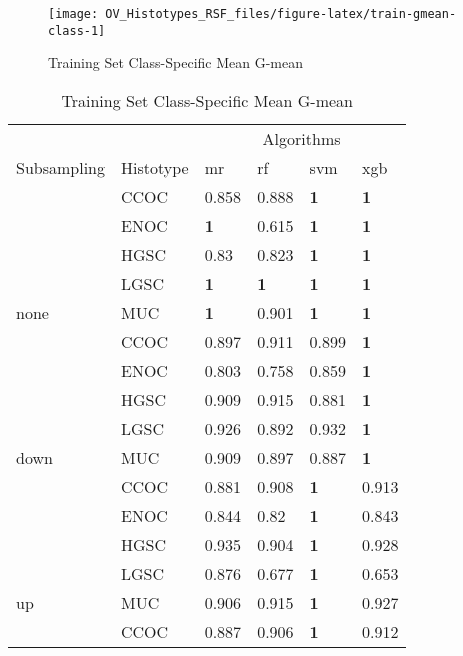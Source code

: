 \documentclass[
]{report}
\begin{document}
\begin{figure}[H]

{\centering \texttt{[image: OV\_Histotypes\_RSF\_files/figure-latex/train-gmean-class-1]} 

}

\caption{Training Set Class-Specific Mean G-mean}\label{fig:train-gmean-class}
\end{figure}

\begin{table}

\caption{\label{tab:train-gmean-class-table}Training Set Class-Specific Mean G-mean}
\centering
\begin{tabular}[t]{l|l|l|l|l|l}
\hline
\multicolumn{2}{c|}{ } & \multicolumn{4}{c}{Algorithms} \\
\cline{3-6}
Subsampling & Histotype & mr & rf & svm & xgb\\
\hline
 & CCOC & 0.858 & 0.888 & \textbf{1} & \textbf{1}\\
\cline{2-6}
 & ENOC & \textbf{1} & 0.615 & \textbf{1} & \textbf{1}\\
\cline{2-6}
 & HGSC & 0.83 & 0.823 & \textbf{1} & \textbf{1}\\
\cline{2-6}
 & LGSC & \textbf{1} & \textbf{1} & \textbf{1} & \textbf{1}\\
\cline{2-6}
\multirow{-5}{*}{\raggedright\arraybackslash none} & MUC & \textbf{1} & 0.901 & \textbf{1} & \textbf{1}\\
\cline{1-6}
 & CCOC & 0.897 & 0.911 & 0.899 & \textbf{1}\\
\cline{2-6}
 & ENOC & 0.803 & 0.758 & 0.859 & \textbf{1}\\
\cline{2-6}
 & HGSC & 0.909 & 0.915 & 0.881 & \textbf{1}\\
\cline{2-6}
 & LGSC & 0.926 & 0.892 & 0.932 & \textbf{1}\\
\cline{2-6}
\multirow{-5}{*}{\raggedright\arraybackslash down} & MUC & 0.909 & 0.897 & 0.887 & \textbf{1}\\
\cline{1-6}
 & CCOC & 0.881 & 0.908 & \textbf{1} & 0.913\\
\cline{2-6}
 & ENOC & 0.844 & 0.82 & \textbf{1} & 0.843\\
\cline{2-6}
 & HGSC & 0.935 & 0.904 & \textbf{1} & 0.928\\
\cline{2-6}
 & LGSC & 0.876 & 0.677 & \textbf{1} & 0.653\\
\cline{2-6}
\multirow{-5}{*}{\raggedright\arraybackslash up} & MUC & 0.906 & 0.915 & \textbf{1} & 0.927\\
\cline{1-6}
 & CCOC & 0.887 & 0.906 & \textbf{1} & 0.912\\

\end{tabular}
\end{table}
\end{document}
